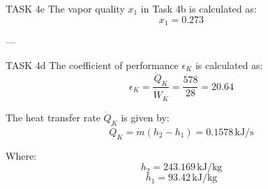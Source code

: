 TASK 4e  
The vapor quality \( x_1 \) in Task 4b is calculated as:  
\[
x_1 = 0.273
\]

---

TASK 4d  
The coefficient of performance \( \epsilon_K \) is calculated as:  
\[
\epsilon_K = \frac{\dot{Q}_K}{\dot{W}_K} = \frac{578}{28} = 20.64
\]

The heat transfer rate \( \dot{Q}_K \) is given by:  
\[
\dot{Q}_K = \dot{m} (h_2 - h_1) = 0.1578 \, \text{kJ/s}
\]

Where:  
\[
h_2 = 243.169 \, \text{kJ/kg}
\]  
\[
h_1 = 93.42 \, \text{kJ/kg}
\]